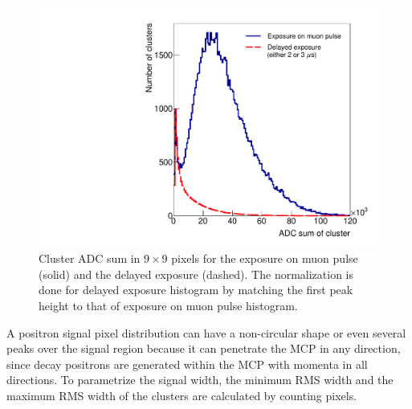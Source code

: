 \documentclass[preprint,3p,twocolumn]{elsarticle}
\begin{document}
\begin{figure}[tbp]
	\centering
	\includegraphics[width=\columnwidth]{figure/Integ_legend_v2.pdf}
	\caption{Cluster ADC sum in $9\times9$ pixels for the
          exposure on muon pulse (solid) and the delayed exposure
          (dashed).  The normalization is done for delayed exposure histogram
          by matching the first peak height to that of exposure on muon pulse histogram.}
	\vspace{-0.2cm}
	\label{fig:BPM_int}
\end{figure}
%

A positron signal pixel distribution can have a non-circular shape or even several
peaks over the signal region because it can penetrate the MCP in
any direction, since decay positrons are generated within the MCP
with momenta in all directions.  
To parametrize the signal
width, the minimum RMS width and the maximum RMS width of the
clusters are calculated by counting pixels. %
\end{document}
